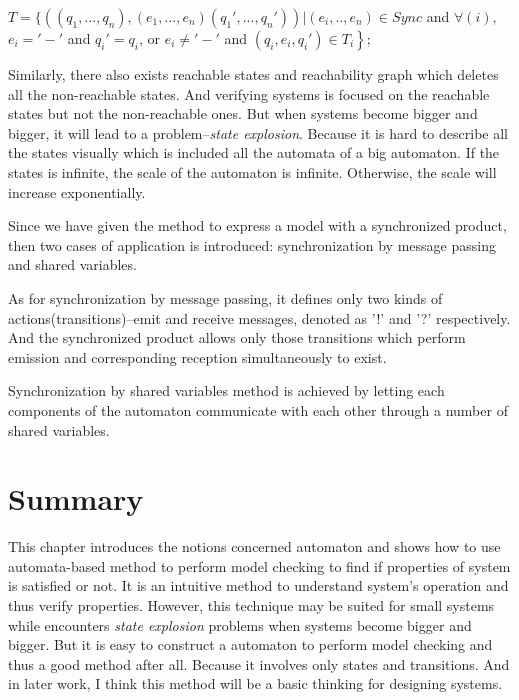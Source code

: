 \documentclass[11pt, conference]{IEEEtran}
\begin{document}
    $T=\left.\{ ((q_1,...,q_n),(e_1,...,e_n)(q_1',...,q_n')) | (e_i,..,e_n)\in Sync \right.$ and $\forall(i)$, $e_i='-'$ and $q_i'=q_i$, or $e_i\neq '-'$ and $(q_i,e_i,q_i')\in T_i \left.\right\} $;
    
    Similarly, there also exists reachable states and reachability graph which deletes all the non-reachable states. And verifying systems is focused on the reachable states but not the non-reachable ones. But when systems become bigger and bigger, it will lead to a problem--{\itshape state explosion}. Because it is hard to describe all the states visually which is included all the automata of a big automaton. If the states is infinite, the scale of the automaton is infinite. Otherwise, the scale will increase exponentially.
    
    Since we have given the method to express a model with a synchronized product, then two cases of application is introduced: synchronization by message passing and shared variables.
    
    As for synchronization by message passing, it defines only two kinds of actions(transitions)--emit and receive messages, denoted as '!' and '?' respectively. And the synchronized product allows only those transitions which perform emission and corresponding reception simultaneously to exist.
    
    Synchronization by shared variables method is achieved by letting each components of the automaton communicate with each other through a number of shared variables.
    
    \section{Summary}
    This chapter introduces the notions concerned automaton and shows how to use automata-based method to perform model checking to find if properties of system is satisfied or not. It is an intuitive method to understand system's operation and thus verify properties. However, this technique may be suited for small systems while encounters {\itshape state explosion} problems when systems become bigger and bigger. But it is easy to construct a automaton to perform model checking and thus a good method after all. Because it involves only states and transitions. And in later work, I think this method will be a basic thinking for designing systems.
    
     
    
     
    
\end{document}
